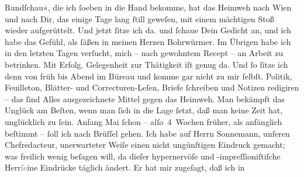 \begin{ledgroupsized}[t]{13cm}
                  Rundſchau«, die ich ſoeben in die Hand bekomme, hat das Heimweh nach Wien und nach Dir, das einige Tage lang ſtill
               geweſen, mit einem mächtigen Stoß wieder aufgerüttelt. Und jetzt ſitze ich
                  da\textcolor{gray}{,} und ſchaue Dein Gedicht an, und ich habe das Gefühl, als ſäßen in meinen
               Herzen \label{T_L02661-1v}\label{T_L02661-1h} Bohrwürmer.\pend
           \pstart
           Im Übrigen habe ich in den letzten Tagen verſucht, mich – nach gewohntem Recept – an
               Arbeit zu betrinken. Mit Erfolg. Gelegenheit zur Thätigkeit iſt genug da. Und ſo
               ſitze ich denn von früh bis Abend im Büreau und komme  gar nicht zu mir ſelbſt. Politik, Feuilleton, Blätter- und
               Correcturen-Leſen, Briefe ſchreiben und Notizen redigiren – {\pb}das ſind Alles ausgezeichnete Mittel gegen das
               Heimweh. Man bekämpft das Unglück am Beſten, wenn man ſich in die Lage ſetzt, daß man
               keine Zeit hat, unglücklich zu ſein. Anfang Mai ſchon –
               alſo 4 Wochen früher, als anfänglich beſtimmt – ſoll ich nach Brüſſel gehen. Ich habe auf Herrn Sonnemann, unſeren Chefredacteur, unerwarteter Weiſe einen nicht ungünſtigen
               Eindruck gemacht; was freilich wenig beſagen will, da dieſer hypernervöſe und
               -impreſſioniſtiſche Herr\textcolor{gray}{ſe}ine Eindrücke täglich ändert. Er hat mir zugeſagt, daß ich in

\end{ledgroupsized}
